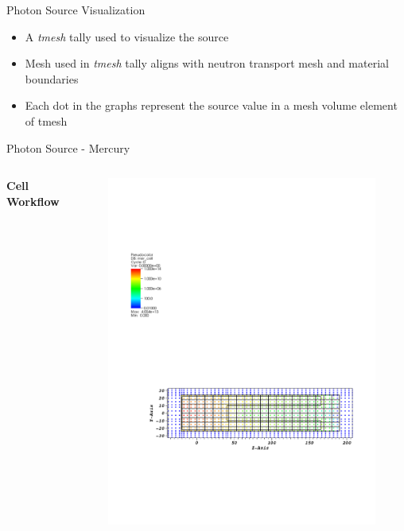 \documentclass{beamer}
\begin{document}
\begin{frame}{Photon Source Visualization}
	\begin{itemize}
		\item{A \textit{tmesh} tally used to visualize the source}
		\item{Mesh used in \textit{tmesh} tally aligns with neutron 
			transport mesh and material boundaries}
		\item{Each dot in the graphs represent the source value 
			in a mesh volume element of tmesh  }
	\end{itemize}
\end{frame}

\begin{frame}{Photon Source - Mercury}
\begin{columns}[T]
        \textbf{Cell Workflow}
        \begin{figure}
                \centering
                \includegraphics[scale=0.49,trim={2.5cm 6cm 1cm 16cm},clip]{figs/src_mer_cell.pdf}
        \end{figure}


\end{columns}
\end{frame}
\end{document}
